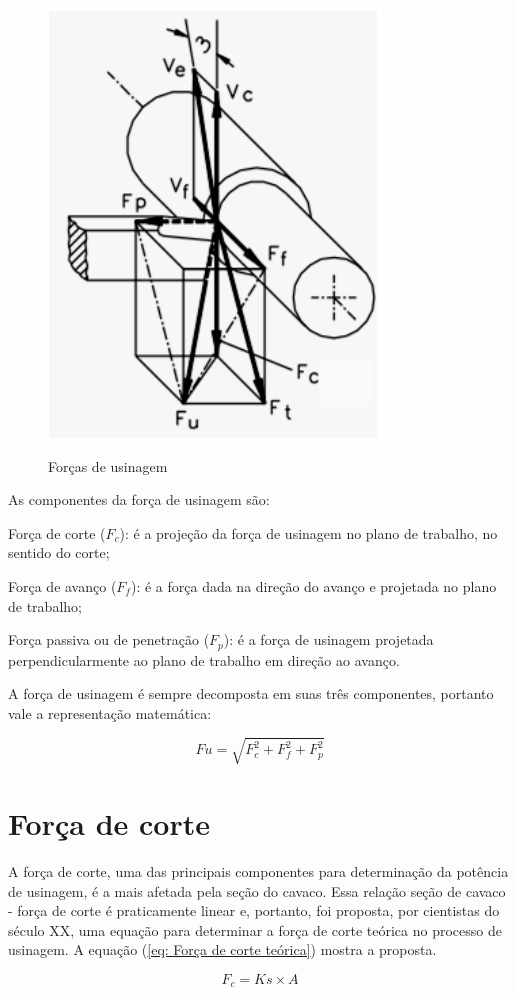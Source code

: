 \documentclass[deposito, acronym, symbols]{fei}
\begin{document}
\begin{figure}[!htb]
 \centering
    \caption{Forças de usinagem}
    \includegraphics[width=0.4\linewidth]{Imagens/Forças de usinagem (1).png}
    \label{fig: Forças de usinagem}
 \end{figure}
 
As componentes da força de usinagem são:

Força de corte ($F_c$): é a projeção da força de usinagem no plano de trabalho, no sentido do corte;

Força de avanço ($F_f$): é a força dada na direção do avanço e projetada no plano de trabalho;

Força passiva ou de penetração ($F_p$): é a força de usinagem projetada perpendicularmente ao plano de trabalho em direção ao avanço.

A força de usinagem é sempre decomposta em suas três componentes, portanto vale a representação matemática:

\begin{equation}
    Fu=\sqrt{F_c^2+F_f^2+F_p^2}    
    \label{eq: Força de usinagem}
\end{equation}
 

\section{Força de corte}
A força de corte, uma das principais componentes para determinação da potência de usinagem, é a mais afetada pela seção do cavaco. Essa relação seção de cavaco - força de corte é praticamente linear e, portanto, foi proposta, por cientistas do século XX, uma equação para determinar a força de corte teórica no processo de usinagem. A equação (\ref{eq: Força de corte teórica}) mostra a proposta.

\begin{equation}
    F_c=Ks\times{A}  
    \label{eq: Força de corte teórica}
\end{equation}
\end{document}
